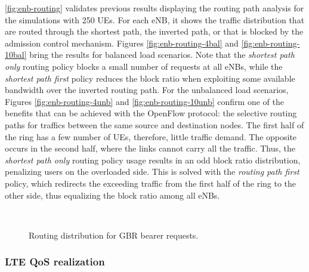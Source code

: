 \autoref{fig:enb-routing} validates previous results displaying the routing
path analysis for the simulations with 250 \acp{UE}. For each \ac{eNB}, it
shows the traffic distribution that are routed through the shortest path, the
inverted path, or that is blocked by the admission control mechanism. Figures
\ref{fig:enb-routing-4bal} and \ref{fig:enb-routing-10bal} bring the results
for balanced load scenarios. Note that the \emph{shortest path only} routing
policy blocks a small number of requests at all \acp{eNB}, while the
\emph{shortest path first} policy reduces the block ratio when exploiting some
available bandwidth over the inverted routing path. For the unbalanced load
scenarios, Figures \ref{fig:enb-routing-4unb} and \ref{fig:enb-routing-10unb}
confirm one of the benefits that can be achieved with the OpenFlow protocol:
the selective routing paths for traffics between the same source and
destination nodes. The first half of the ring has a few number of \acp{UE},
therefore, little traffic demand. The opposite occurs in the second half, where
the links cannot carry all the traffic. Thus, the \emph{shortest path only}
routing policy usage results in an odd block ratio distribution, penalizing
users on the overloaded side. This is solved with the \emph{routing path first}
policy, which redirects the exceeding traffic from the first half of the ring
to the other side, thus equalizing the block ratio among all \acp{eNB}.

\begin{figure}[htb]
  \centering
  \hfil
   \\
  \hfil
  \caption{Routing distribution for \ac{GBR} bearer requests.}
  \label{fig:enb-routing}
\end{figure}

\subsubsection{\acs{LTE} \acs{QoS} realization}
\label{subsec:coexistence}

